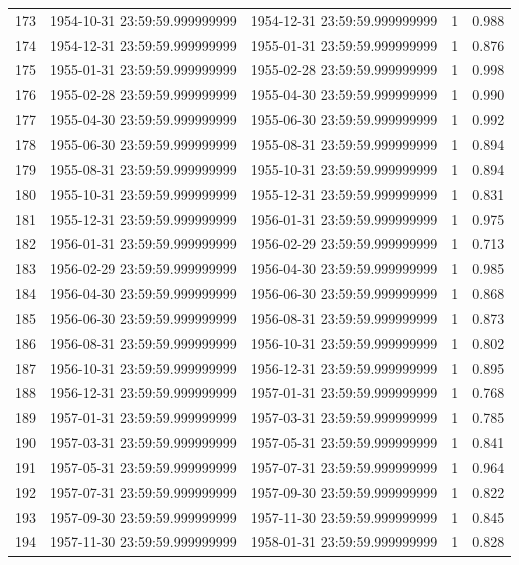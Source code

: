 \begin{table}
\begin{tabular}{lcccc}
173 & 1954-10-31 23:59:59.999999999 & 1954-12-31 23:59:59.999999999 & 1 & 0.988 \\
174 & 1954-12-31 23:59:59.999999999 & 1955-01-31 23:59:59.999999999 & 1 & 0.876 \\
175 & 1955-01-31 23:59:59.999999999 & 1955-02-28 23:59:59.999999999 & 1 & 0.998 \\
176 & 1955-02-28 23:59:59.999999999 & 1955-04-30 23:59:59.999999999 & 1 & 0.990 \\
177 & 1955-04-30 23:59:59.999999999 & 1955-06-30 23:59:59.999999999 & 1 & 0.992 \\
178 & 1955-06-30 23:59:59.999999999 & 1955-08-31 23:59:59.999999999 & 1 & 0.894 \\
179 & 1955-08-31 23:59:59.999999999 & 1955-10-31 23:59:59.999999999 & 1 & 0.894 \\
180 & 1955-10-31 23:59:59.999999999 & 1955-12-31 23:59:59.999999999 & 1 & 0.831 \\
181 & 1955-12-31 23:59:59.999999999 & 1956-01-31 23:59:59.999999999 & 1 & 0.975 \\
182 & 1956-01-31 23:59:59.999999999 & 1956-02-29 23:59:59.999999999 & 1 & 0.713 \\
183 & 1956-02-29 23:59:59.999999999 & 1956-04-30 23:59:59.999999999 & 1 & 0.985 \\
184 & 1956-04-30 23:59:59.999999999 & 1956-06-30 23:59:59.999999999 & 1 & 0.868 \\
185 & 1956-06-30 23:59:59.999999999 & 1956-08-31 23:59:59.999999999 & 1 & 0.873 \\
186 & 1956-08-31 23:59:59.999999999 & 1956-10-31 23:59:59.999999999 & 1 & 0.802 \\
187 & 1956-10-31 23:59:59.999999999 & 1956-12-31 23:59:59.999999999 & 1 & 0.895 \\
188 & 1956-12-31 23:59:59.999999999 & 1957-01-31 23:59:59.999999999 & 1 & 0.768 \\
189 & 1957-01-31 23:59:59.999999999 & 1957-03-31 23:59:59.999999999 & 1 & 0.785 \\
190 & 1957-03-31 23:59:59.999999999 & 1957-05-31 23:59:59.999999999 & 1 & 0.841 \\
191 & 1957-05-31 23:59:59.999999999 & 1957-07-31 23:59:59.999999999 & 1 & 0.964 \\
192 & 1957-07-31 23:59:59.999999999 & 1957-09-30 23:59:59.999999999 & 1 & 0.822 \\
193 & 1957-09-30 23:59:59.999999999 & 1957-11-30 23:59:59.999999999 & 1 & 0.845 \\
194 & 1957-11-30 23:59:59.999999999 & 1958-01-31 23:59:59.999999999 & 1 & 0.828 \\

\end{tabular}
\end{table}

